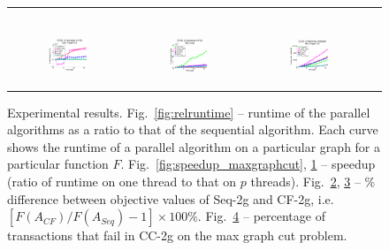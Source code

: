 \documentclass{article} %
\newcommand{\hogwild}{CF-2g}
\newcommand{\occ}{CC-2g}
\newcommand{\seqalg}{Seq-2g}
\newcommand{\hogwildshort}{CF}
\newcommand{\seqalgshort}{Seq}
\newcommand{\figref}[1]{Fig.~\ref{#1}}
\begin{document}
\begin{figure}[ht]
\begin{tabular}{cccc}
\begin{subfigure}[h]{0.30\textwidth}
			\caption{}
			\label{fig:speedup_setcover}
	  \end{subfigure} \\
	  \begin{subfigure}[h]{0.30\textwidth}
	  	\includegraphics[width=130pt]{images/summary_diffFA_maxgraphcut.pdf}
			\caption{}
			\label{fig:difffa_maxgraphcut}
	  \end{subfigure} &
	  \begin{subfigure}[h]{0.30\textwidth}
	  	\includegraphics[width=130pt]{images/summary_diffFA_setcover.pdf}
			\caption{}
			\label{fig:difffa_setcover}
	  \end{subfigure} &
	  \begin{subfigure}[h]{0.30\textwidth}
	  	\includegraphics[width=130pt]{images/summary_validated_maxgraphcut.pdf}
			\caption{}
			\label{fig:validated_maxgraphcut}
	  \end{subfigure} \\
  \end{tabular}
  \caption{\footnotesize Experimental results.
  \figref{fig:relruntime} -- runtime of the parallel algorithms as a ratio to that of the sequential algorithm. Each curve shows the runtime of a parallel algorithm on a particular graph for a particular function $F$.
  \figref{fig:speedup_maxgraphcut}, \ref{fig:speedup_setcover} -- speedup (ratio of runtime on one thread to that on $p$ threads).
  \figref{fig:difffa_maxgraphcut}, \ref{fig:difffa_setcover} -- \% difference between objective values of \seqalg{} and \hogwild{}, i.e. $[F(A_{\hogwildshort{}}) / F(A_{\seqalgshort{}}) - 1] \times 100\%$.
  \figref{fig:validated_maxgraphcut} -- percentage of transactions that fail in \occ{} on the max graph cut problem.
  }
\label{fig:results_quality}
\end{figure}
\end{document}
